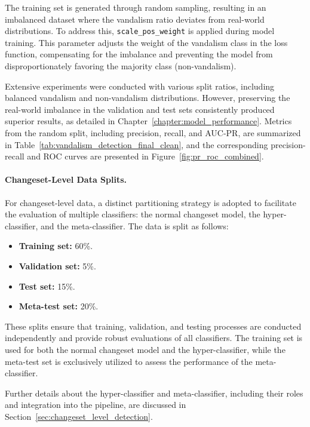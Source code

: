 \documentclass[
    13pt, %
    a4paper, %
    listof=totoc, %
    bibliography=totoc, %
    index=totoc, %
    headsepline
]{scrreprt}
\begin{document}
The training set is generated through random sampling, resulting in an imbalanced dataset where the vandalism ratio deviates from real-world distributions. To address this, \texttt{scale\_pos\_weight} is applied during model training. This parameter adjusts the weight of the vandalism class in the loss function, compensating for the imbalance and preventing the model from disproportionately favoring the majority class (non-vandalism).

Extensive experiments were conducted with various split ratios, including balanced vandalism and non-vandalism distributions. However, preserving the real-world imbalance in the validation and test sets consistently produced superior results, as detailed in Chapter~\ref{chapter:model_performance}. Metrics from the random split, including precision, recall, and AUC-PR, are summarized in Table~\ref{tab:vandalism_detection_final_clean}, and the corresponding precision-recall and ROC curves are presented in Figure~\ref{fig:pr_roc_combined}.

\paragraph{Changeset-Level Data Splits.}
For changeset-level data, a distinct partitioning strategy is adopted to facilitate the evaluation of multiple classifiers: the normal changeset model, the hyper-classifier, and the meta-classifier. The data is split as follows:

\begin{itemize}
    \item \textbf{Training set:} 60\%.
    \item \textbf{Validation set:} 5\%.
    \item \textbf{Test set:} 15\%.
    \item \textbf{Meta-test set:} 20\%.
\end{itemize}

These splits ensure that training, validation, and testing processes are conducted independently and provide robust evaluations of all classifiers. The training set is used for both the normal changeset model and the hyper-classifier, while the meta-test set is exclusively utilized to assess the performance of the meta-classifier.

Further details about the hyper-classifier and meta-classifier, including their roles and integration into the pipeline, are discussed in Section~\ref{sec:changeset_level_detection}.
\end{document}
